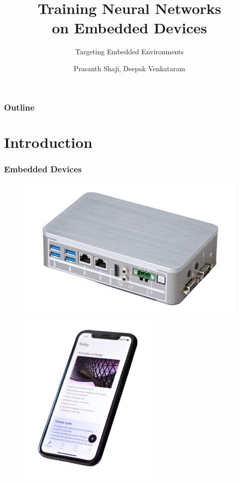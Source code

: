 \documentclass{beamer}
\title
{Training Neural Networks \\ on Embedded Devices}
\subtitle{Targeting Embedded Environments}
\author[Prasanth Shaji, Deepak Venkataram]
{Prasanth Shaji, Deepak Venkataram}
\institute[Dept. of Information Technology]
{
  Master's Thesis \\
  Uppsala University
}
\date[{\today}]
\begin{document}
\begin{frame}[plain]
  \titlepage
\end{frame}

\begin{frame}
    \frametitle{Outline}
    \tableofcontents
\end{frame}

\section{Introduction}

\begin{frame}
  \frametitle{Embedded Devices}

  \begin{figure}
    \centering
    \includegraphics[scale=0.21]{images/edge-pc}
    \hspace{2em}
    \includegraphics[scale=0.27]{images/smart-phone}

\end{figure}
\end{frame}
\end{document}

